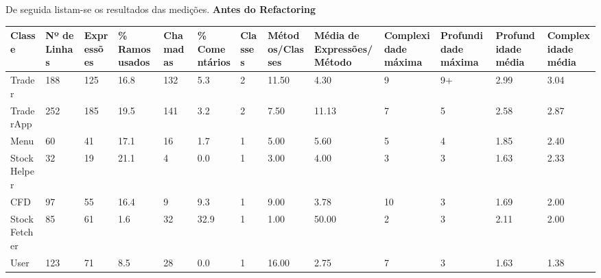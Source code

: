 De seguida listam-se os resultados das medições.
\vspace{5mm}
\newline\textbf{Antes do Refactoring}

\begin{table}[ht]
\centering
\begin{adjustbox}{width=1\textwidth}
\small
\begin{tabular}{|l|l|l|l|l|l|l|l|l|l|l|l|l|}
\hline
Classe                       & Nº de Linhas & Expressões & \% Ramos usados & Chamadas & \% Comentários & Classes & Métodos/Classes & Média de Expressões/Método & Complexidade máxima & Profundidade máxima & Profundidade média & Complexidade média \\ \hline
Trader                       & 188          & 125        & 16.8            & 132      & 5.3            & 2       & 11.50           & 4.30                       & 9                   & 9+                  & 2.99               & 3.04               \\ \hline
TraderApp                    & 252          & 185        & 19.5            & 141      & 3.2            & 2       & 7.50            & 11.13                      & 7                   & 5                   & 2.58               & 2.87               \\ \hline
Menu                         & 60           & 41         & 17.1            & 16       & 1.7            & 1       & 5.00            & 5.60                       & 5                   & 4                   & 1.85               & 2.40               \\ \hline
StockHelper                  & 32           & 19         & 21.1            & 4        & 0.0            & 1       & 3.00            & 4.00                       & 3                   & 3                   & 1.63               & 2.33               \\ \hline
CFD                          & 97           & 55         & 16.4            & 9        & 9.3            & 1       & 9.00            & 3.78                       & 10                  & 3                   & 1.69               & 2.00               \\ \hline
StockFetcher                 & 85           & 61         & 1.6             & 32       & 32.9           & 1       & 1.00            & 50.00                      & 2                   & 3                   & 2.11               & 2.00               \\ \hline
User                         & 123          & 71         & 8.5             & 28       & 0.0            & 1       & 16.00           & 2.75                       & 7                   & 3                   & 1.63               & 1.38               \\ \hline

\end{tabular}
\end{adjustbox}
\end{table}
